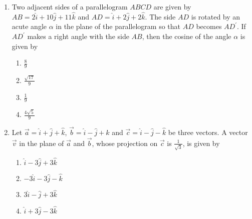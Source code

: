 \begin{enumerate}[label=\thesubsection.\arabic*.,ref=\thesubsection.\theenumi]
\begin{enumerate}
    \end{enumerate}
	\item %
		Two adjacent sides of a parallelogram $ABCD$ are given by $AB = 2\hat{i}+10\hat{j}+11\hat{k}$ and $AD = \hat{i}+2\hat{j}+2\hat{k}$. 
		The side $AD$ is rotated by an acute angle $\alpha$ in the plane of the parallelogram so that $AD$ becomes $AD^{\prime}$. If $AD^{\prime}$ makes a right angle with the side $AB$, then the cosine of the angle $\alpha$ is given by \hfill{}
    \begin{multicols}{4} 
\begin{enumerate}
	\item $\frac{8}{9}$
	\item $\frac{\sqrt{17}}{9}$
	\item $\frac{1}{9}$
	\item $\frac{4\sqrt{5}}{9}$\\
\end{enumerate}
    \end{multicols}
        \item %
		Let $\vec{a}=\hat{i}+\hat{j}+\hat{k}$, $\vec{b}=\hat{i}-\hat{j}+\hat{k}$ and $\vec{c}=\hat{i}-\hat{j}-\hat{k}$ be three vectors. A vector $\vec{v}$ in the plane of $\vec{a}$ and $\vec{b}$, whose projection on $\vec{c}$ is $\frac{1}{\sqrt{3}}$, is given by \hfill{}
    \begin{multicols}{4} 
\begin{enumerate}
	\item $\hat{i}-3\hat{j}+3\hat{k}$
	\item $-3\hat{i}-3\hat{j}-\hat{k}$
	\item $3\hat{i}-\hat{j}+3\hat{k}$
	\item $\hat{i}+3\hat{j}-3\hat{k}$
\end{enumerate}
    \end{multicols}


\end{enumerate}
